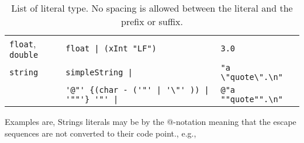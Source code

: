 \begin{table}
\begin{tabular}{|l|l|l|}
    \lstinline!float!, \lstinline!double! & \lstinline[language=ebnf]!float | (xInt "LF")!  & \lstinline!3.0!  \\
    \lstinline!string! & \lstinline[language=ebnf]!simpleString |! & \lstinline!"a \"quote\".\n"!  \\
         & \lstinline[language=ebnf]!'@"' {(char - ('"' | '\"' )) | '""'} '"' |!&\lstinline!@"a ""quote"".\n"! \\
    \hline
  \end{tabular}
  \caption{List of literal type. No spacing is allowed between the literal and the prefix or suffix. 
  }
  \label{tab:literalTypes}
\end{table}
Examples are,
%
%
Strings literals may be  by the @-notation %
meaning that the escape sequences are not converted to their code point., e.g.,
%
%

